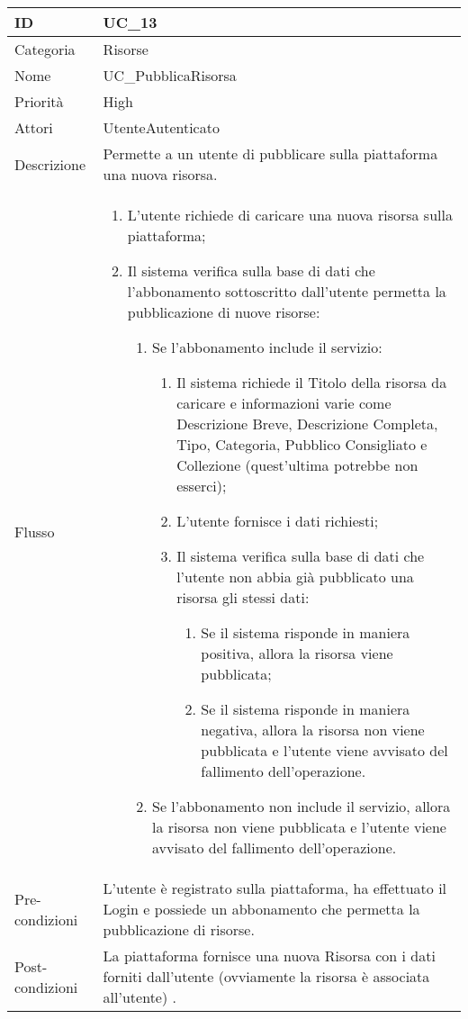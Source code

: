 \begin{center}
\begin{tabular}{ |p{2cm}|p{13cm}|  }
\hline
ID & UC\_13 \\\hline
Categoria & Risorse\\\hline
Nome & UC\_PubblicaRisorsa\\\hline
Priorità & High \\\hline
Attori &  UtenteAutenticato\\\hline
Descrizione & Permette a un utente di pubblicare sulla piattaforma una nuova risorsa.\\\hline
Flusso &  	\begin{enumerate}
			\item L'utente richiede di caricare una nuova risorsa sulla piattaforma;
			\item Il sistema verifica sulla base di dati che l'abbonamento sottoscritto dall'utente permetta la pubblicazione di nuove risorse:
			\begin{enumerate}
				\item Se l'abbonamento include il servizio:
				\begin{enumerate}
					\item Il sistema richiede il Titolo della risorsa da caricare e informazioni varie come Descrizione Breve,  Descrizione Completa, Tipo, Categoria, Pubblico Consigliato e Collezione (quest'ultima potrebbe non esserci);
					\item L'utente fornisce i dati richiesti;
					\item Il sistema verifica sulla base di dati che l'utente non abbia già pubblicato una risorsa gli stessi dati:
					\begin{enumerate}
						\item Se il sistema risponde in maniera positiva, allora la risorsa viene pubblicata;
						\item Se il sistema risponde in maniera negativa, allora  la risorsa non viene pubblicata e l'utente viene avvisato del fallimento dell'operazione.
					\end{enumerate}
				\end{enumerate}
				\item Se l'abbonamento non include il servizio, allora la risorsa non viene pubblicata e l'utente viene avvisato del fallimento dell'operazione.
			\end{enumerate}
		\end{enumerate}\\\hline
Pre-condizioni & L'utente è registrato sulla piattaforma, ha effettuato il Login e possiede un abbonamento che permetta la pubblicazione di risorse.\\\hline
Post-condizioni & La piattaforma fornisce una nuova Risorsa con i dati forniti dall'utente (ovviamente la risorsa è associata all'utente) .\\\hline
\end{tabular}
\label{table_use_case:13} \newline


\end{center}
